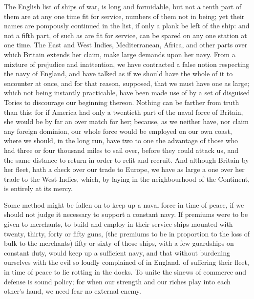 \documentclass[12pt, twocolumn]{book}
\begin{document}
    The English list of ships of war, is long and formidable, but not a tenth part of them are at any one time fit for service, numbers of them not in being; yet their names are pompously continued in the list, if only a plank be left of the ship: and not a fifth part, of such as are fit for service, can be spared on any one station at one time. The East and West Indies, Mediterranean, Africa, and other parts over which Britain extends her claim, make large demands upon her navy. From a mixture of prejudice and inattention, we have contracted a false notion respecting the navy of England, and have talked as if we should have the whole of it to encounter at once, and for that reason, supposed, that we must have one as large; which not being instantly practicable, have been made use of by a set of disguised Tories to discourage our beginning thereon. Nothing can be farther from truth than this; for if America had only a twentieth part of the naval force of Britain, she would be by far an over match for her; because, as we neither have, nor claim any foreign dominion, our whole force would be employed on our own coast, where we should, in the long run, have two to one the advantage of those who had three or four thousand miles to sail over, before they could attack us, and the same distance to return in order to refit and recruit. And although Britain by her fleet, hath a check over our trade to Europe, we have as large a one over her trade to the West-Indies, which, by laying in the neighbourhood of the Continent, is entirely at its mercy.

    Some method might be fallen on to keep up a naval force in time of peace, if we should not judge it necessary to support a constant navy. If premiums were to be given to merchants, to build and employ in their service ships mounted with twenty, thirty, forty or fifty guns, (the premiums to be in proportion to the loss of bulk to the merchants) fifty or sixty of those ships, with a few guardships on constant duty, would keep up a sufficient navy, and that without burdening ourselves with the evil so loudly complained of in England, of suffering their fleet, in time of peace to lie rotting in the docks. To unite the sinews of commerce and defense is sound policy; for when our strength and our riches play into each other’s hand, we need fear no external enemy.
\end{document}
